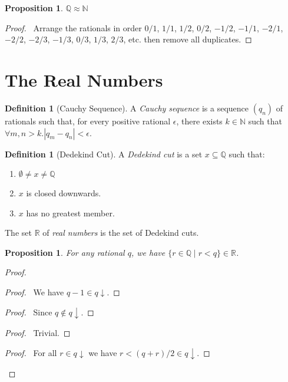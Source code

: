\documentclass{book}
\let\qed\relax
\newtheorem{prop}[ax]{Proposition}
\theoremstyle{definition}
\newtheorem{df}[ax]{Definition}
\begin{document}
\begin{prop}
$\mathbb{Q} \approx \mathbb{N}$
\end{prop}

\begin{proof}
\pf\ Arrange the rationals in order $0/1$, $1/1$, $1/2$, $0/2$, $-1/2$, $-1/1$, $-2/1$, $-2/2$, $-2/3$, $-1/3$, $0/3$, $1/3$, $2/3$, etc. then remove all duplicates. \qed
\end{proof}
\section{The Real Numbers}

\begin{df}[Cauchy Sequence]
A \emph{Cauchy sequence} is a sequence $(q_n)$ of rationals such that, for every positive rational $\epsilon$, there exists $k \in \mathbb{N}$ such that $\forall m,n > k. |q_m - q_n| < \epsilon$.
\end{df}


\begin{df}[Dedekind Cut]
A \emph{Dedekind cut} is a set $x \subseteq \mathbb{Q}$ such that:
\begin{enumerate}
\item $\emptyset \neq x \neq \mathbb{Q}$
\item $x$ is closed downwards.
\item $x$ has no greatest member.
\end{enumerate}

The set $\mathbb{R}$ of \emph{real numbers} is the set of Dedekind cuts.
\end{df}

\begin{prop}
For any rational $q$, we have $\{ r \in \mathbb{Q} \mid r < q \} \in \mathbb{R}$.
\end{prop}

\begin{proof}
\pf
{}
\begin{proof}
	\pf\ We have $q - 1 \in q \downarrow$.
\end{proof}
\begin{proof}
	\pf\ Since $q \notin q \downarrow$.
\end{proof}
\begin{proof}
	\pf\ Trivial.
\end{proof}
\begin{proof}
	\pf\ For all $r \in q \downarrow$ we have $r < (q+r)/2 \in q \downarrow$.
\end{proof}
\qed
\end{proof}
\end{document}
